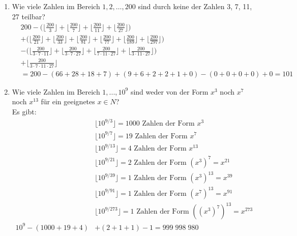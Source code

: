 \begin{enumerate}[label=(\alph*)]
        \item Wie viele Zahlen im Bereich $1, 2,\ldots, 200$ sind durch keine der Zahlen 3, 7, 11, 27 teilbar?\\
        \begin{align*}
	        &200 - \bigg(\bigg\lfloor\frac{200}{3}\bigg\rfloor + \bigg\lfloor\frac{200}{7}\bigg\rfloor
	         + \bigg\lfloor\frac{200}{11}\bigg\rfloor + \bigg\lfloor\frac{200}{27}\bigg\rfloor \bigg) \\
	        &+ \bigg(\bigg\lfloor\frac{200}{21}\bigg\rfloor + \bigg\lfloor\frac{200}{33}\bigg\rfloor 
	         + \bigg\lfloor\frac{200}{81}\bigg\rfloor + \bigg\lfloor\frac{200}{77}\bigg\rfloor
	         + \bigg\lfloor\frac{200}{189}\bigg\rfloor + \bigg\lfloor\frac{200}{297}\bigg\rfloor\bigg) \\ 
	        &-\bigg(\bigg\lfloor\frac{200}{3\cdot 7\cdot 11}
	         \bigg\rfloor+\bigg\lfloor\frac{200}{3\cdot 7\cdot 27}\bigg\rfloor + 
	         \bigg\lfloor\frac{200}{7\cdot 11\cdot 27}\bigg\rfloor +
	         \bigg\lfloor\frac{200}{3\cdot 11\cdot 27}\bigg\rfloor \bigg) \\
	        &+ \bigg\lfloor\frac{200}{3\cdot 7\cdot 11 \cdot 27}\bigg\rfloor \\
	        &= 200 - (66+28+18+7) + (9 + 6 + 2 + 2 + 1 + 0) - (0 + 0 + 0 + 0) + 0 = 101
        \end{align*}

        \item Wie viele Zahlen im Bereich $1,...,10^9$ sind weder von der Form $x^3$ noch $x^7$ 
        noch $x^{13}$ für ein geeignetes $x \in N$?\\
        Es gibt: 
	    \begin{align*}
		    &\lfloor 10^{9/3}\rfloor = 1000  \text{ Zahlen der Form } x^3 \\
		    &\lfloor 10^{9/7}\rfloor= 19  \text{ Zahlen der Form }x^7 \\
		    &\lfloor 10^{9/13}\rfloor= 4  \text{ Zahlen der Form }x^{13} \\
		    &\lfloor 10^{9/21}\rfloor= 2  \text{ Zahlen der Form } (x^{3})^7 = x^{21} \\
		    &\lfloor 10^{9/39}\rfloor= 1  \text{ Zahlen der Form } (x^{3})^{13} = x^{39} \\
		    &\lfloor 10^{9/91}\rfloor= 1  \text{ Zahlen der Form } (x^{7})^{13} = x^{91} \\
		    &\lfloor 10^{9/273}\rfloor= 1  \text{ Zahlen der Form } ((x^{3})^7)^{13} = x^{273} \\
		    10^9-(1000+19+4)&+(2+1+1)-1=999\; 998\; 980
        \end{align*}
        

\end{enumerate}
